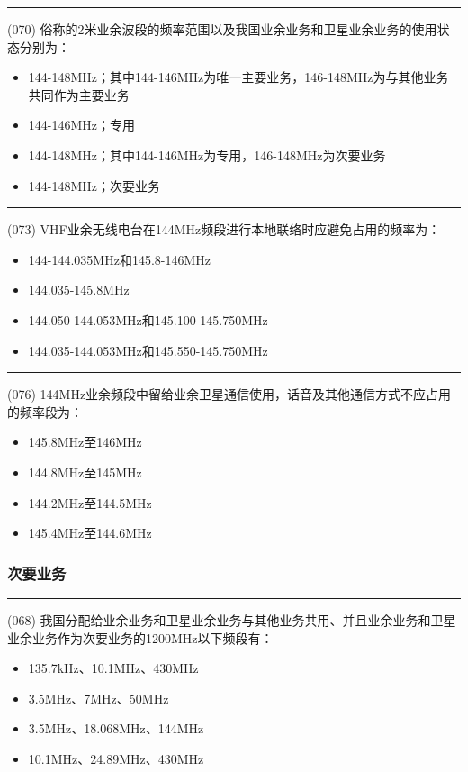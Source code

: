 \documentclass[twocolumn,hyperref,UTF8]{ctexart}  %
\begin{document}
\noindent\rule{0.5\textwidth}{1pt}
\heiti (070) 俗称的2米业余波段的频率范围以及我国业余业务和卫星业余业务的使用状态分别为： \songti {\color{gray} [LK0158] }
\begin{itemize}
	\item  144-148MHz；其中{\color{LimeGreen}144-146MHz为唯一主要业务}，146-148MHz为与其他业务共同作为主要业务
	\item  144-146MHz；专用
	\item  144-148MHz；其中144-146MHz为专用，146-148MHz为次要业务
	\item  144-148MHz；次要业务
\end{itemize}



\noindent\rule{0.5\textwidth}{1pt}
\heiti (073) VHF业余无线电台在144MHz频段进行{\color{cyan}本地联络时}应避免占用的频率为： \songti {\color{gray} [LK0171] }
\begin{itemize}
	\item  144-144.035MHz和145.8-146MHz
	\item  144.035-145.8MHz
	\item  144.050-144.053MHz和145.100-145.750MHz
	\item  144.035-144.053MHz和145.550-145.750MHz
\end{itemize}


\noindent\rule{0.5\textwidth}{1pt}
\heiti (076) 144MHz业余频段中{\color{cyan}留给业余卫星通信使用，话音及其他通信方式不应占用}的频率段为： \songti {\color{gray} [LK1032] }
\begin{itemize}
	\item  145.8MHz至146MHz
	\item  144.8MHz至145MHz
	\item  144.2MHz至144.5MHz
	\item  145.4MHz至144.6MHz
\end{itemize}


\vspace{12pt}
\subsubsection{次要业务}


\noindent\rule{0.5\textwidth}{1pt}
\heiti (068) 我国分配给业余业务和卫星业余业务与其他业务共用、并且业余业务和卫星业余业务{\color{cyan}作为次要业务}的1200MHz以下频段有： \songti {\color{gray} [LK0148] }
\begin{itemize}
	\item  {\color{LimeGreen}135.7kHz}、{\color{LimeGreen}10.1MHz}、{\color{LimeGreen}430MHz}
	\item  3.5MHz、7MHz、{\color{red}50MHz}
	\item  3.5MHz、18.068MHz、{\color{red}144MHz}
	\item  {\color{LimeGreen}10.1MHz}、24.89MHz、{\color{LimeGreen}430MHz}
\end{itemize}
\end{document}
